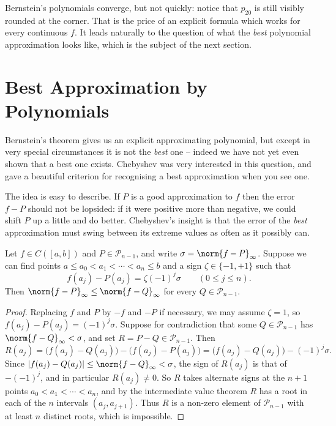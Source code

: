 \documentclass[a4paper]{scrartcl}
\newcommand{\Pn}{\mathcal{P}}
\begin{document}
\begin{center}
\end{center}

Bernstein's polynomials converge, but not quickly: notice that $p_{20}$ is still visibly rounded at the corner. That is the price of an explicit formula which works for every continuous $f$. It leads naturally to the question of what the \emph{best} polynomial approximation looks like, which is the subject of the next section.

\section{Best Approximation by Polynomials}

Bernstein's theorem gives us an explicit approximating polynomial, but except in very special circumstances it is not the \emph{best} one -- indeed we have not yet even shown that a best one exists. Chebyshev was very interested in this question, and gave a beautiful criterion for recognising a best approximation when you see one.

The idea is easy to describe. If $P$ is a good approximation to $f$ then the error $f - P$ should not be lopsided: if it were positive more than negative, we could shift $P$ up a little and do better. Chebyshev's insight is that the error of the \emph{best} approximation must swing between its extreme values as often as it possibly can.

\begin{theorem}\label{thm:equiripple}
	Let $f\in C([a,b])$ and $P \in \Pn_{n-1}$, and write $\sigma = \norm{f-P}_\infty$. Suppose we can find points $a \leq a_0 < a_1 < \cdots < a_n\leq b$ and a sign $\zeta\in\{-1,+1\}$ such that
	$$f(a_j)-P(a_j) = \zeta(-1)^j\sigma \qquad (0\leq j\leq n).$$
	Then $\norm{f-P}_\infty \leq \norm{f-Q}_\infty$ for every $Q \in \Pn_{n-1}$.
\end{theorem}

\begin{proof}
	Replacing $f$ and $P$ by $-f$ and $-P$ if necessary, we may assume $\zeta = 1$, so $f(a_j)-P(a_j) = (-1)^j\sigma$. Suppose for contradiction that some $Q\in\Pn_{n-1}$ has $\norm{f-Q}_\infty < \sigma$, and set $R = P - Q\in\Pn_{n-1}$. Then
	$$R(a_j) = \big(f(a_j)-Q(a_j)\big) - \big(f(a_j)-P(a_j)\big) = \big(f(a_j)-Q(a_j)\big) - (-1)^j\sigma.$$
	Since $|f(a_j)-Q(a_j)|\leq \norm{f-Q}_\infty<\sigma$, the sign of $R(a_j)$ is that of $-(-1)^j$, and in particular $R(a_j)\neq 0$. So $R$ takes alternate signs at the $n+1$ points $a_0<a_1<\cdots<a_n$, and by the intermediate value theorem $R$ has a root in each of the $n$ intervals $(a_j,a_{j+1})$. Thus $R$ is a non-zero element of $\Pn_{n-1}$ with at least $n$ distinct roots, which is impossible.
\end{proof}
\end{document}
